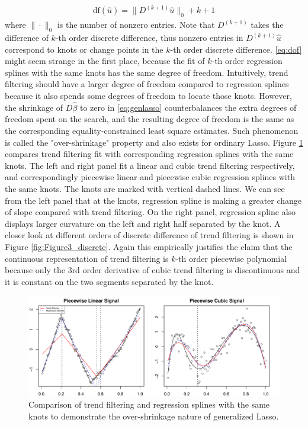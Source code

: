 \documentclass[a4paper]{article}
\begin{document}
\begin{align}
\mbox{df}(\hat{u}) = \|D^{(k+1)}\hat{u}\|_0 + k + 1 \label{eq:dof}
\end{align}
where $\|\cdot\|_0$ is the number of nonzero entries. Note that $D^{(k+1)}$ takes the difference of $k$-th order discrete difference, thus nonzero entries in $D^{(k+1)}\hat{u}$ correspond to knots or change points in the $k$-th order discrete difference. \eqref{eq:dof} might seem strange in the first place, because the fit of $k$-th order regression splines with the same knots has the same degree of freedom. Intuitively, trend filtering should have a larger degree of freedom compared to regression splines because it also spends some degrees of freedom to locate those knots. However, the shrinkage of $D\hat{\beta}$ to zero in \eqref{eq:genlasso} counterbalances the extra degrees of freedom spent on the search, and the resulting degree of freedom is the same as the corresponding equality-constrained least square estimates. Such phenomenon is called the "over-shrinkage" property and also exists for ordinary Lasso. Figure \ref{fig:Figure2_overshrinkage} compares trend filtering fit with corresponding regression splines with the same knots. The left and right panel fit a linear and cubic trend filtering respectively, and correspondingly piecewise linear and piecewise cubic regression splines with the same knots. The knots are marked with vertical dashed lines. We can see from the left panel that at the knots, regression spline is making a greater change of slope compared with trend filtering. On the right panel, regression spline also displays larger curvature on the left and right half separated by the knot. A closer look at different orders of discrete difference of trend filtering is shown in Figure \ref{fig:Figure3_discrete}. Again this empirically justifies the claim that the continuous representation of trend filtering is $k$-th order piecewise polynomial because only the $3$rd order derivative of cubic trend filtering is discontinuous and it is constant on the two segments separated by the knot.  

\begin{figure}[t!]
\centering
\includegraphics[width = 1.0\textwidth]{Figures/Figure2.pdf}
\caption{Comparison of trend filtering and regression splines with the same knots to demonstrate the over-shrinkage nature of generalized Lasso.}
\label{fig:Figure2_overshrinkage}
\end{figure}
\end{document}
